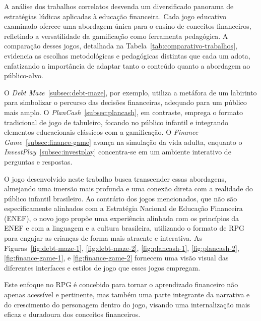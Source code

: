 A análise dos trabalhos correlatos desvenda um diversificado panorama de estratégias lúdicas aplicadas à educação financeira. Cada jogo educativo examinado oferece uma abordagem única para o ensino de conceitos financeiros, refletindo a versatilidade da gamificação como ferramenta pedagógica. A comparação desses jogos, detalhada na Tabela~\ref{tab:comparativo-trabalhos}, evidencia as escolhas metodológicas e pedagógicas distintas que cada um adota, enfatizando a importância de adaptar tanto o conteúdo quanto a abordagem ao público-alvo.

O \textit{Debt Maze}~\ref{subsec:debt-maze}, por exemplo, utiliza a metáfora de um labirinto para simbolizar o percurso das decisões financeiras, adequado para um público mais amplo. O \textit{PlanCash}~\ref{subsec:plancash}, em contraste, emprega o formato tradicional de jogo de tabuleiro, focando no público infantil e integrando elementos educacionais clássicos com a gamificação. O \textit{Finance Game}~\ref{subsec:finance-game} avança na simulação da vida adulta, enquanto o \textit{InvestPlay}~\ref{subsec:investplay} concentra-se em um ambiente interativo de perguntas e respostas.

O jogo desenvolvido neste trabalho busca transcender essas abordagens, almejando uma imersão mais profunda e uma conexão direta com a realidade do público infantil brasileiro. Ao contrário dos jogos mencionados, que não são especificamente alinhados com a Estratégia Nacional de Educação Financeira (ENEF), o novo jogo propõe uma experiência alinhada com os princípios da ENEF e com a linguagem e a cultura brasileira, utilizando o formato de RPG para engajar as crianças de forma mais atraente e interativa. As Figuras~\ref{fig:debt-maze-1}, \ref{fig:debt-maze-2}, \ref{fig:plancash-1}, \ref{fig:plancash-2}, \ref{fig:finance-game-1}, e \ref{fig:finance-game-2} fornecem uma visão visual das diferentes interfaces e estilos de jogo que esses jogos empregam.

Este enfoque no RPG é concebido para tornar o aprendizado financeiro não apenas acessível e pertinente, mas também uma parte integrante da narrativa e do crescimento do personagem dentro do jogo, visando uma internalização mais eficaz e duradoura dos conceitos financeiros.

